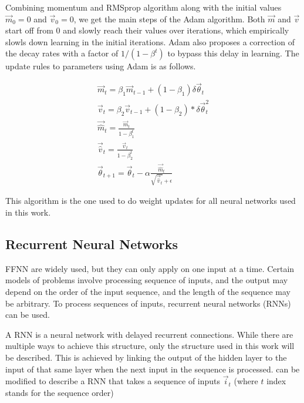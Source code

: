 \documentclass[../dissertation.tex]{subfiles}
\begin{document}
Combining momentum and RMSprop algorithm along with the initial values $\vec{m}_0 = 0$ and $\vec{v}_0 = 0$, we get the main steps of the Adam algorithm.
Both $\vec{m}$ and $\vec{v}$ start off from 0 and slowly reach their values over iterations, which empirically slowls down learning in the initial iterations.
Adam also proposes a correction of the decay rates with a factor of $1 / (1 - \beta^{t})$ to bypass this delay in learning.
The update rules to parameters using Adam is as follows.

\begin{align}
    \vec{m}_t = \beta_1 \vec{m}_{t-1} + (1 - \beta_1) \delta \vec{\theta}_t \\
    \vec{v}_t = \beta_2 \vec{v}_{t-1} + (1 - \beta_2) * \delta \vec{\theta}_t^2 \\
    \vec{\hat{m}}_t = \frac{\vec{m}_t}{1 - \beta_1^t} \\
    \vec{\hat{v}}_t = \frac{\vec{v}_t}{1 - \beta_2^t} \\
    \vec{\theta}_{t + 1} = \vec{\theta}_t - \alpha \frac{\vec{\hat{m}}_t}{\sqrt{\vec{\hat{v}}_t} + \epsilon}
\end{align}

This algorithm is the one used to do weight updates for all neural networks used in this work.

\subsection{Recurrent Neural Networks}

FFNN are widely used, but they can only apply on one input at a time.
Certain models of problems involve processing sequence of inputs, and the output may depend on the order of the input sequence, and the length of the sequence may be arbitrary.
To process sequences of inputs, recurrent neural networks (RNNs) can be used.

A RNN is a neural network with delayed recurrent connections.
While there are multiple ways to achieve this structure, only the structure used in this work will be described.
This is achieved by linking the output of the hidden layer to the input of that same layer when the next input in the sequence is processed.
 can be modified to describe a RNN that takes a sequence of inputs $\vec{i}_t$ (where $t$ index stands for the sequence order)
\end{document}
